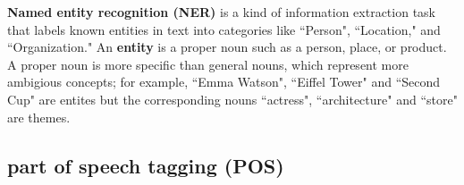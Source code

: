 \textbf{Named entity recognition (NER)} is a kind of information extraction task that labels known entities in text into categories like ``Person", ``Location," and ``Organization." An \textbf{entity} is a proper noun such as a person, place, or product. A proper noun is more specific than general nouns, which represent more ambigious concepts; for example, ``Emma Watson", ``Eiffel Tower" and ``Second Cup" are entites but the corresponding nouns ``actress", ``architecture" and ``store" are themes.



% 
% 
%     







\subsection{part of speech tagging (POS)} \label{nlptask:postagging}

